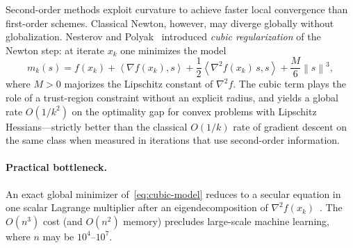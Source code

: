 \documentclass[11pt,a4paper]{article}
\newcommand{\norm}[1]{\left\|#1\right\|}
\newcommand{\inner}[2]{\left\langle #1,#2\right\rangle}
\newcommand{\grad}{\nabla}
\newcommand{\hess}{\nabla^{2}}
\begin{document}
Second-order methods exploit curvature to achieve faster local convergence than first-order schemes.
Classical Newton, however, may diverge globally without globalization.
Nesterov and Polyak~\cite{nesterov2006cubic} introduced \emph{cubic regularization} of the Newton step: at iterate $x_{k}$ one minimizes the model
\begin{equation}
\label{eq:cubic-model}
m_{k}(s)
=
f(x_{k})
+
\inner{\grad f(x_{k})}{s}
+
\frac12\inner{\hess f(x_{k})\,s}{s}
+
\frac{M}{6}\norm{s}^{3},
\end{equation}
where $M>0$ majorizes the Lipschitz constant of $\hess f$.
The cubic term plays the role of a trust-region constraint without an explicit radius, and yields a global rate $O(1/k^{2})$ on the optimality gap for convex problems with Lipschitz Hessians---strictly better than the classical $O(1/k)$ rate of gradient descent on the same class when measured in iterations that use second-order information.

\paragraph{Practical bottleneck.}
An exact global minimizer of~\eqref{eq:cubic-model} reduces to a secular equation in one scalar Lagrange multiplier after an eigendecomposition of $\hess f(x_{k})$~\cite{conn2000trust,cartis2011arc}.
The $O(n^{3})$ cost (and $O(n^{2})$ memory) precludes large-scale machine learning, where $n$ may be $10^{4}$--$10^{7}$.
\end{document}

